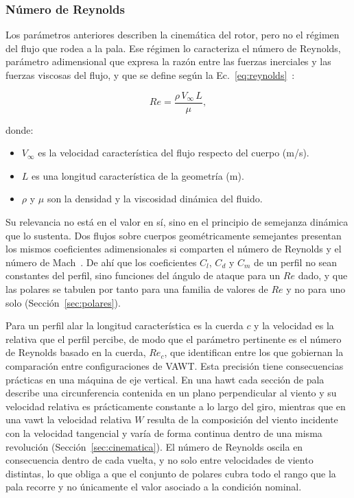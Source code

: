 \subsubsection{Número de Reynolds}
\label{sec:reynolds_def}

Los parámetros anteriores describen la cinemática del rotor, pero no el régimen del flujo que rodea a la pala. Ese régimen lo caracteriza el número de Reynolds, parámetro adimensional que expresa la razón entre las fuerzas inerciales y las fuerzas viscosas del flujo, y que se define según la Ec.~\ref{eq:reynolds}~\parencite{Anderson2016}:

\begin{equation}
    Re = \frac{\rho \, V_\infty \, L}{\mu},
    \label{eq:reynolds}
\end{equation}

donde:
\begin{itemize}
    \item $V_\infty$ es la velocidad característica del flujo respecto del cuerpo (m/s).
    \item $L$ es una longitud característica de la geometría (m).
    \item $\rho$ y $\mu$ son la densidad y la viscosidad dinámica del fluido.
\end{itemize}

Su relevancia no está en el valor en sí, sino en el principio de semejanza dinámica que lo sustenta. Dos flujos sobre cuerpos geométricamente semejantes presentan los mismos coeficientes adimensionales si comparten el número de Reynolds y el número de Mach~\parencite{Anderson2016}. De ahí que los coeficientes $C_l$, $C_d$ y $C_m$ de un perfil no sean constantes del perfil, sino funciones del ángulo de ataque para un $Re$ dado, y que las polares se tabulen por tanto para una familia de valores de $Re$ y no para uno solo (Sección~\ref{sec:polares}).

Para un perfil alar la longitud característica es la cuerda $c$ y la velocidad es la relativa que el perfil percibe, de modo que el parámetro pertinente es el número de Reynolds basado en la cuerda, $Re_c$, que \textcite{Essahraoui2026} identifican entre los que gobiernan la comparación entre configuraciones de VAWT. Esta precisión tiene consecuencias prácticas en una máquina de eje vertical. En una \gls{hawt} cada sección de pala describe una circunferencia contenida en un plano perpendicular al viento y su velocidad relativa es prácticamente constante a lo largo del giro, mientras que en una \gls{vawt} la velocidad relativa $W$ resulta de la composición del viento incidente con la velocidad tangencial y varía de forma continua dentro de una misma revolución (Sección~\ref{sec:cinematica}). El número de Reynolds oscila en consecuencia dentro de cada vuelta, y no solo entre velocidades de viento distintas, lo que obliga a que el conjunto de polares cubra todo el rango que la pala recorre y no únicamente el valor asociado a la condición nominal.


